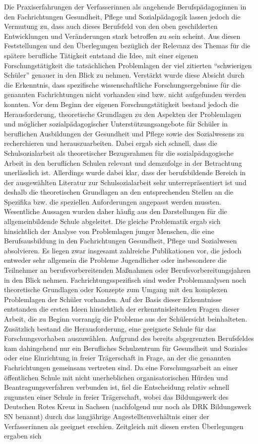 Die Praxiserfahrungen der Verfasserinnen als angehende Berufspädagoginnen in den Fachrichtungen Gesundheit, Pflege und Sozialpädagogik lassen jedoch die Vermutung zu, dass auch dieses Berufsfeld von den oben geschilderten Entwicklungen und Veränderungen stark betroffen zu sein scheint. Aus diesen Feststellungen und den Überlegungen bezüglich der Relevanz des Themas für die spätere berufliche Tätigkeit entstand die Idee, mit einer eigenen Forschungstätigkeit die tatsächlichen Problemlagen der viel zitierten "`schwierigen Schüler"' genauer in den Blick zu nehmen. Verstärkt wurde diese Absicht durch die Erkenntnis, dass spezifische wissenschaftliche Forschungsergebnisse für die genannten Fachrichtungen nicht vorhanden sind bzw. nicht aufgefunden werden konnten. Vor dem Beginn der eigenen Forschungstätigkeit bestand jedoch die Herausforderung, theoretische Grundlagen zu den Aspekten der Problemlagen und möglicher sozialpädagogischer Unterstützungsangebote für Schüler in beruflichen Ausbildungen der Gesundheit und Pflege sowie des Sozialwesens zu recherchieren und herauszuarbeiten. Dabei ergab sich schnell, dass die Schulsozialarbeit als theoretischer Bezugsrahmen für die sozial\-pä\-da\-gogische Arbeit in den beruflichen Schulen relevant und demzufolge in der Betrachtung unerlässlich ist. Allerdings wurde dabei klar, dass der berufsbildende Bereich in der ausgewählten Literatur zur Schulsozialarbeit sehr unterrepräsentiert ist und deshalb die theoretischen Grundlagen an den entsprechenden Stellen an die Spezifika bzw. die speziellen Anforderungen angepasst werden mussten. Wesentliche Aussagen wurden daher häufig aus den Darstellungen für die allgemeinbildende Schule abgeleitet. Die gleiche Problematik ergab sich hinsichtlich der Analyse von Problemlagen junger Menschen, die eine Berufsausbildung in den Fachrichtungen Gesundheit, Pflege und Sozialwesen absolvieren. Es liegen zwar insgesamt zahlreiche Publikationen vor, die jedoch entweder sehr allgemein die Probleme Jugendlicher oder insbesondere die Teilnehmer an berufsvorbereitenden Maßnahmen oder Berufsvorbereitungsjahren in den Blick nehmen. Fachrichtungsspezifisch sind weder Problemanalysen noch theoretische Grundlagen oder Konzepte zum Umgang mit den komplexen Problemlagen der Schüler vorhanden. Auf der Basis dieser Erkenntnisse entstanden die ersten Ideen hinsichtlich der erkenntnisleitenden Fragen dieser Arbeit, die zu Beginn vorrangig die Probleme aus der Schülersicht beinhalteten. Zusätzlich bestand die Herausforderung, eine geeignete Schule für das Forschungsvorhaben auszuwählen. Aufgrund des bereits abgegrenzten Berufsfeldes kam dahingehend nur ein Berufliches Schulzentrum für Gesundheit und Soziales oder eine Einrichtung in freier Trägerschaft in Frage, an der die genannten Fachrichtungen gemeinsam vertreten sind. Da eine Forschungsarbeit an einer öffentlichen Schule mit nicht unerheblichen organisatorischen Hürden und Beantragungsverfahren verbunden ist, fiel die Entscheidung relativ schnell zugunsten einer Schule in freier Trägerschaft, wobei das Bildungswerk des Deutschen Rotes Kreuz in Sachsen (nachfolgend nur noch als DRK Bildungswerk SN benannt) durch das langjährige Angestelltenverhältnis einer der Verfasserinnen als geeignet er\-schien. Zeitgleich mit diesen ersten Überlegungen ergaben sich 